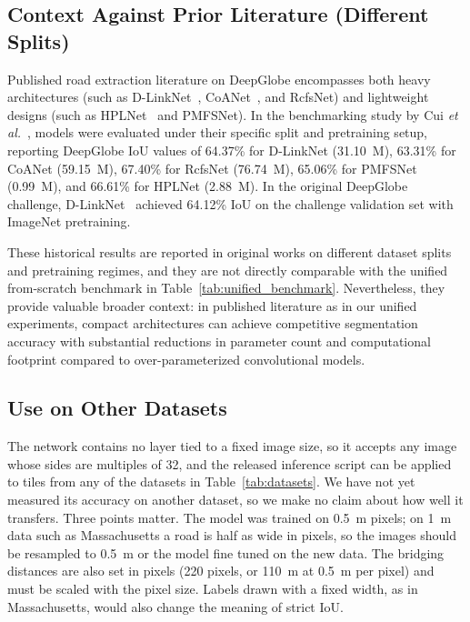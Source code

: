 \documentclass{ieeeaccess}
\begin{document}
\subsection{Context Against Prior Literature (Different Splits)}
\label{sec:prior_lit}

Published road extraction literature on DeepGlobe encompasses both heavy architectures (such as D-LinkNet~\cite{zhou2018dlinknet}, CoANet~\cite{mei2021coanet}, and RcfsNet) and lightweight designs (such as HPLNet~\cite{cui2025hplnet} and PMFSNet). In the benchmarking study by Cui \emph{et al.}~\cite{cui2025hplnet}, models were evaluated under their specific split and pretraining setup, reporting DeepGlobe IoU values of 64.37\% for D-LinkNet (31.10~M), 63.31\% for CoANet (59.15~M), 67.40\% for RcfsNet (76.74~M), 65.06\% for PMFSNet (0.99~M), and 66.61\% for HPLNet (2.88~M). In the original DeepGlobe challenge, D-LinkNet~\cite{zhou2018dlinknet} achieved 64.12\% IoU on the challenge validation set with ImageNet pretraining.

These historical results are reported in original works on different dataset splits and pretraining regimes, and they are not directly comparable with the unified from-scratch benchmark in Table~\ref{tab:unified_benchmark}. Nevertheless, they provide valuable broader context: in published literature as in our unified experiments, compact architectures can achieve competitive segmentation accuracy with substantial reductions in parameter count and computational footprint compared to over-parameterized convolutional models.

\subsection{Use on Other Datasets}

The network contains no layer tied to a fixed image size, so it accepts any image whose sides are multiples of 32, and the released inference script can be applied to tiles from any of the datasets in Table~\ref{tab:datasets}. We have not yet measured its accuracy on another dataset, so we make no claim about how well it transfers. Three points matter. The model was trained on 0.5~m pixels; on 1~m data such as Massachusetts a road is half as wide in pixels, so the images should be resampled to 0.5~m or the model fine tuned on the new data. The bridging distances are also set in pixels (220 pixels, or 110~m at 0.5~m per pixel) and must be scaled with the pixel size. Labels drawn with a fixed width, as in Massachusetts, would also change the meaning of strict IoU.
\end{document}

